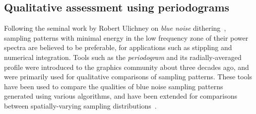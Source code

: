 %
%
%

\subsection{Qualitative assessment using periodograms}
Following the seminal work by Robert Ulichney on \emph{blue noise} dithering~\cite{Ulichney:87:halftoning}, sampling patterns with minimal energy in the low frequency zone of their power spectra are believed to be preferable, for applications such as stippling and numerical integration. Tools such as the \emph{periodogram} and its radially-averaged profile were introduced to the graphics community about three decades ago, and were primarily used for qualitative comparisons of sampling patterns. 
%
These tools have been used to compare the qualities of blue noise sampling patterns generated using various algorithms, and have been extended for comparisons between spatially-varying sampling distributions~\cite{Wei:2011:DDA}. 

